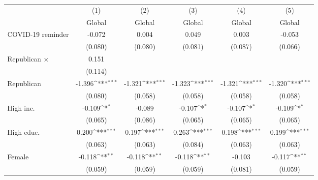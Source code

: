 {
\def\sym#1{\ifmmode^{#1}\else\(^{#1}\)\fi}
\begin{tabular}{l*{5}{c}}
\toprule
                    &\multicolumn{1}{c}{(1)}&\multicolumn{1}{c}{(2)}&\multicolumn{1}{c}{(3)}&\multicolumn{1}{c}{(4)}&\multicolumn{1}{c}{(5)}\\
                    &\multicolumn{1}{c}{Global}&\multicolumn{1}{c}{Global}&\multicolumn{1}{c}{Global}&\multicolumn{1}{c}{Global}&\multicolumn{1}{c}{Global}\\
\midrule
COVID-19 reminder   &      -0.072         &       0.004         &       0.049         &       0.003         &      -0.053         \\
                    &     (0.080)         &     (0.080)         &     (0.081)         &     (0.087)         &     (0.066)         \\
\addlinespace
Republican $\times$ &       0.151         &                     &                     &                     &                     \\
                    &     (0.114)         &                     &                     &                     &                     \\
\addlinespace
Republican          &      -1.396\sym{***}&      -1.321\sym{***}&      -1.323\sym{***}&      -1.321\sym{***}&      -1.320\sym{***}\\
                    &     (0.080)         &     (0.058)         &     (0.058)         &     (0.058)         &     (0.058)         \\
\addlinespace
High inc.           &      -0.109\sym{*}  &      -0.089         &      -0.107\sym{*}  &      -0.107\sym{*}  &      -0.109\sym{*}  \\
                    &     (0.065)         &     (0.086)         &     (0.065)         &     (0.065)         &     (0.065)         \\
\addlinespace
High educ.          &       0.200\sym{***}&       0.197\sym{***}&       0.263\sym{***}&       0.198\sym{***}&       0.199\sym{***}\\
                    &     (0.063)         &     (0.063)         &     (0.084)         &     (0.063)         &     (0.063)         \\
\addlinespace
Female              &      -0.118\sym{**} &      -0.118\sym{**} &      -0.118\sym{**} &      -0.103         &      -0.117\sym{**} \\
                    &     (0.059)         &     (0.059)         &     (0.059)         &     (0.081)         &     (0.059)         \\

\end{tabular}}
